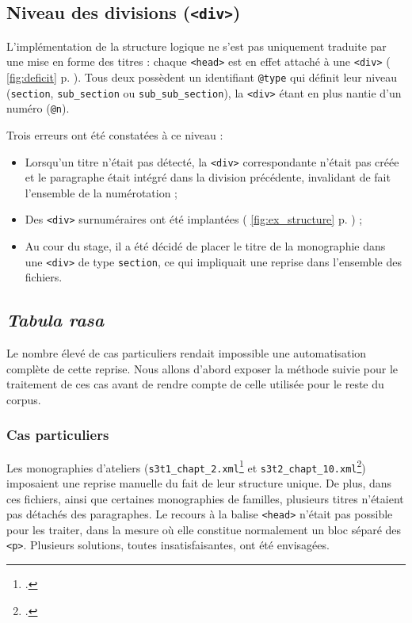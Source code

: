 \subsection{Niveau des divisions (\texttt{<div>})}

L'implémentation de la structure logique ne s'est pas uniquement traduite par une mise en forme des titres : chaque \texttt{<head>} est en effet attaché à une \texttt{<div>} (\fig{} \ref{fig:deficit} p. \pageref{fig:deficit}). Tous deux possèdent un identifiant \texttt{@type} qui définit leur niveau (\texttt{section}, \texttt{sub\_section} ou \texttt{sub\_sub\_section}), la \texttt{<div>} étant en plus nantie d'un numéro (\texttt{@n}).

Trois erreurs ont été constatées à ce niveau :

\begin{itemize}
    \item Lorsqu'un titre n'était pas détecté, la \texttt{<div>} correspondante n'était pas créée et le paragraphe était intégré dans la division précédente, invalidant de fait l'ensemble de la numérotation ;
    \item Des \texttt{<div>} surnuméraires ont été implantées (\fig{} \ref{fig:ex_structure} p. \pageref{fig:ex_structure}) ;
    \item Au cour du stage, il a été décidé de placer le titre de la monographie dans une \texttt{<div>} de type \texttt{section}, ce qui impliquait une reprise dans l'ensemble des fichiers.
\end{itemize}

\subsection{\textit{Tabula rasa}}

Le nombre élevé de cas particuliers rendait impossible une automatisation complète de cette reprise. Nous allons d'abord exposer la méthode suivie pour le traitement de ces cas avant de rendre compte de celle utilisée pour le reste du corpus.

\subsubsection{Cas particuliers}

Les monographies d'ateliers (\texttt{s3t1\_chapt\_2.xml}\footcite{mono472a} et \texttt{s3t2\_chapt\_10.xml}\footcite{mono473a}) imposaient une reprise manuelle du fait de leur structure unique. De plus, dans ces fichiers, ainsi que certaines monographies de familles, plusieurs titres n'étaient pas détachés des paragraphes. Le recours à la balise \texttt{<head>} n'était pas possible pour les traiter, dans la mesure où elle constitue normalement un bloc séparé des \texttt{<p>}. Plusieurs solutions, toutes insatisfaisantes, ont été envisagées.

